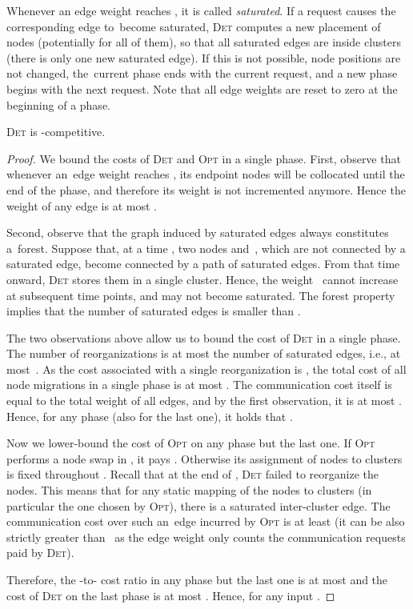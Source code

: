 \documentclass{siamart190516}
\newcommand{\OPT}{\textsc{Opt}\xspace}
\newcommand{\DET}{\textsc{Det}\xspace}
\begin{document}
Whenever an edge weight reaches , it is called \emph{saturated}. If a
request causes the corresponding edge to~become saturated,
\DET computes a new placement of nodes (potentially for all of them), so that all
saturated edges are inside clusters (there is only one new saturated edge). If
this is not possible, node positions are not changed, the~current phase ends
with the current request, and a new phase begins with the next request. Note
that all edge weights are reset to zero at the beginning of a phase.


\begin{theorem}
\DET is -competitive.
\end{theorem}

\begin{proof}
We bound the costs of \DET and \OPT in a single phase. First, observe that
whenever an~edge weight reaches , its endpoint nodes will be collocated 
until the end of the phase, and therefore its weight is not
incremented anymore. Hence the weight of any edge is at most .

Second, observe that the graph induced by saturated edges always constitutes 
a~forest. Suppose that, at a time ,
two nodes  and~, which are not
connected by a saturated edge, become connected by a path of saturated edges.
From that time onward, \DET stores them in a single cluster. Hence, the
weight~ cannot increase at subsequent time points, and  may
not become saturated. The forest property implies that the number of saturated
edges is smaller than .

The two observations above allow us to bound the cost of \DET in a single
phase. The number of reorganizations is at most the number of saturated edges,
i.e., at most~. As the cost associated with a single
reorganization is , the total cost of all node
migrations in a single phase is at most .
The communication cost itself is equal to the total weight of all edges, and
by the first observation, it is at most . Hence, for any phase  (also
for the last one), it holds that .

Now we lower-bound the cost of \OPT on any phase  but the last one. If \OPT
performs a node swap in , it pays . Otherwise its assignment of
nodes to clusters is fixed throughout . Recall that at the end of , \DET
failed to reorganize the nodes. This means that for any static mapping of the
nodes to clusters (in particular the one chosen by \OPT), there is a
saturated inter-cluster edge. The communication cost over such an~edge incurred
by \OPT is at least  (it can be also strictly greater than~ as
the edge weight only counts the communication requests paid by \DET).

Therefore, the -to- cost ratio in any phase but the last one is at
most  and the cost of \DET on the last phase is at
most . Hence,
 for any input .
\end{proof}
\end{document}

